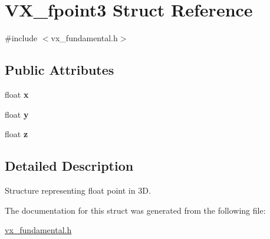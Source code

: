 \hypertarget{structVX__fpoint3}{\section{V\-X\-\_\-fpoint3 Struct Reference}
\label{structVX__fpoint3}
}


{\ttfamily \#include $<$vx\-\_\-fundamental.\-h$>$}

\subsection*{Public Attributes}
\begin{DoxyCompactItemize}
\item 
\hypertarget{structVX__fpoint3_a26c170d692c8a6407b7b86d35a045ab8}{float {\bfseries x}}\label{structVX__fpoint3_a26c170d692c8a6407b7b86d35a045ab8}

\item 
\hypertarget{structVX__fpoint3_a1bf3e320a1936ef105302b77dd4d0260}{float {\bfseries y}}\label{structVX__fpoint3_a1bf3e320a1936ef105302b77dd4d0260}

\item 
\hypertarget{structVX__fpoint3_a64fb4d0658b92d03e85a3c4e071a74d4}{float {\bfseries z}}\label{structVX__fpoint3_a64fb4d0658b92d03e85a3c4e071a74d4}

\end{DoxyCompactItemize}


\subsection{Detailed Description}
Structure representing float point in 3\-D. 

The documentation for this struct was generated from the following file\-:\begin{DoxyCompactItemize}
\item 
\hyperlink{vx__fundamental_8h}{vx\-\_\-fundamental.\-h}\end{DoxyCompactItemize}
